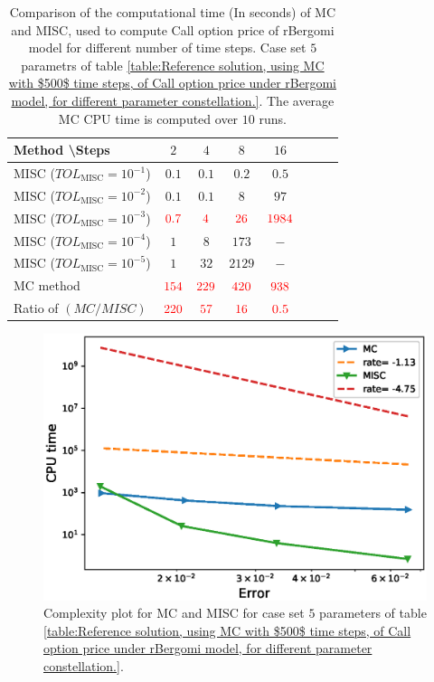 \begin{table}[h!]
	\centering
	\begin{tabular}{l*{6}{c}r}
		Method \textbackslash  Steps            & $2$ & $4$ & $8$ & $16$ &   \\
		\hline
		MISC ($TOL_{\text{MISC}}=10^{-1}$)  & $0.1$ & $0.1$ & $0.2$ & $0.5$ \\
		MISC ($TOL_{\text{MISC}}=10^{-2}$)  & $0.1$ & $0.1$ & $8$ & $97$ \\
		MISC ($TOL_{\text{MISC}}=10^{-3}$)  & $\red{0.7}$ & $\red{4}$ & $\red{26}$ & $\red{1984}$ \\
		MISC ($TOL_{\text{MISC}}=10^{-4}$)  & $1$ & $8$ & $173$ & $-$\\
		MISC ($TOL_{\text{MISC}}=10^{-5}$)  & $1$ & $32$ & $2129$ & $-$
		\\
		\hline
		MC method   & $ \red{154}
		
		$  & $  \red{229}$  & $  \red{420}$ & $ \red{938}
		$  \\	
		\hline
		Ratio of $\left(MC/MISC \right)$ & $ \red{   220}
		
		$  & $  \red{
		 57
		}$  & $  \red{    16
		}$ & $ \red{ 0.5}
		$  \\	
				
		\hline
	\end{tabular}
	\caption{Comparison of the computational time (In seconds) of  MC and MISC, used to compute Call option price of rBergomi model for different number of time steps. Case set $5$ parametrs of table \ref{table:Reference solution, using MC with $500$ time steps, of Call option price under rBergomi model, for different parameter constellation.}. The average  MC CPU time is computed over $10$ runs. }
	\label{Comparsion of the computational time of  MC and MISC, used to compute Call option price of rBergomi model for different number of time steps. Case set5}
\end{table}
	\begin{figure}[h!]
	\centering
	\includegraphics[width=0.5\linewidth]{./figures/rBergomi_Complexity_rates/set7/error_vs_time_set7}
	
	\caption{Complexity plot for   MC and MISC for case set $5$ parameters of table \ref{table:Reference solution, using MC with $500$ time steps, of Call option price under rBergomi model, for different parameter constellation.}.}
	\label{fig:Complexity plot for MC and MISC for Case set $5$ parameters}
\end{figure}
\FloatBarrier



